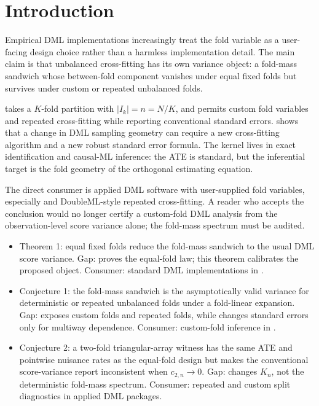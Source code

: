 \documentclass[11pt]{article}
\theoremstyle{definition}
\theoremstyle{plain}
\theoremstyle{remark}
\begin{document}
\section{Introduction}
Empirical DML implementations increasingly treat the fold variable as a user-facing design choice rather than a harmless implementation detail. The main claim is that unbalanced cross-fitting has its own variance object: a fold-mass sandwich whose between-fold component vanishes under equal fixed folds but survives under custom or repeated unbalanced folds.

\citet[Algorithm 3.1(a)]{ChernozhukovEtAl2018DML} takes a \(K\)-fold partition with \(|I_k|=n=N/K\), and \citet[Sections~5.2.1--5.2.4]{AhrensHansenSchafferWiemann2024DDML} permits custom fold variables and repeated cross-fitting while reporting conventional standard errors. \citet[abstract]{ChiangKatoMaSasaki2022MultiwayDML} shows that a change in DML sampling geometry can require a new cross-fitting algorithm and a new robust standard error formula. The kernel lives in exact identification and causal-ML inference: the ATE is standard, but the inferential target is the fold geometry of the orthogonal estimating equation.

The direct consumer is applied DML software with user-supplied fold variables, especially \citet{AhrensHansenSchafferWiemann2024DDML} and DoubleML-style repeated cross-fitting. A reader who accepts the conclusion would no longer certify a custom-fold DML analysis from the observation-level score variance alone; the fold-mass spectrum must be audited.

\begin{itemize}[leftmargin=*]
\item Theorem 1: equal fixed folds reduce the fold-mass sandwich to the usual DML score variance. Gap: \citet{ChernozhukovEtAl2018DML} proves the equal-fold law; this theorem calibrates the proposed object. Consumer: standard DML implementations in \citet{BachEtAl2024DoubleMLR}.
\item Conjecture 1: the fold-mass sandwich is the asymptotically valid variance for deterministic or repeated unbalanced folds under a fold-linear expansion. Gap: \citet{AhrensHansenSchafferWiemann2024DDML} exposes custom folds and repeated folds, while \citet{ChiangKatoMaSasaki2022MultiwayDML} changes standard errors only for multiway dependence. Consumer: custom-fold inference in \citet{AhrensHansenSchafferWiemann2024DDML}.
\item Conjecture 2: a two-fold triangular-array witness has the same ATE and pointwise nuisance rates as the equal-fold design but makes the conventional score-variance report inconsistent when \(c_{2,n}\to0\). Gap: \citet{Velez2024DMLGrowingK} changes \(K_n\), not the deterministic fold-mass spectrum. Consumer: repeated and custom split diagnostics in applied DML packages.
\end{itemize}
\end{document}
